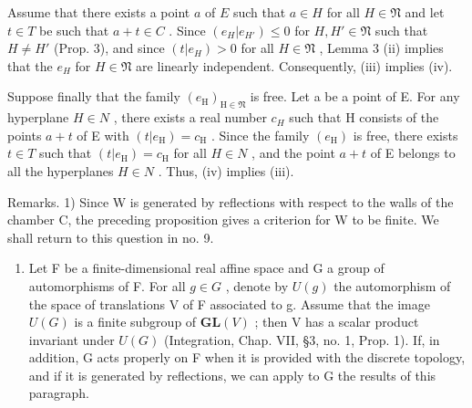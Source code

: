 Assume that there exists a point \(a\) of \(E\) such that \(a \in H\) for all \(H \in \mathfrak{N}\) and let \(t \in T\) be such that \(a + t \in C\) . Since \((e_H | e_{H'}) \leqslant 0\) for \(H, H' \in \mathfrak{N}\) such that \(H \neq H'\) (Prop. 3), and since \((t | e_H) > 0\) for all \(H \in \mathfrak{N}\) , Lemma 3 (ii) implies that the \(e_H\) for \(H \in \mathfrak{N}\) are linearly independent. Consequently, (iii) implies (iv).

Suppose finally that the family \((e_{\mathrm{H}})_{\mathrm{H}\in\mathfrak{N}}\) is free. Let a be a point of E. For any hyperplane \(H\in N\) , there exists a real number \(c_{H}\) such that H consists of the points \(a+t\) of E with \((t|e_{\mathrm{H}})=c_{\mathrm{H}}\) . Since the family \((e_{\mathrm{H}})\) is free, there exists \(t\in T\) such that \((t|e_{\mathrm{H}})=c_{\mathrm{H}}\) for all \(H\in N\) , and the point \(a+t\) of E belongs to all the hyperplanes \(H\in N\) . Thus, (iv) implies (iii).

Remarks. 1) Since W is generated by reflections with respect to the walls of the chamber C, the preceding proposition gives a criterion for W to be finite. We shall return to this question in no. 9.

\begin{enumerate}
\def\labelenumi{\arabic{enumi})}
\setcounter{enumi}{1}
\tightlist
\item
  Let F be a finite-dimensional real affine space and G a group of automorphisms of F. For all \(g \in G\) , denote by \(U(g)\) the automorphism of the space of translations V of F associated to g. Assume that the image \(U(G)\) is a finite subgroup of \(\mathbf{GL}(V)\) ; then V has a scalar product invariant under \(U(G)\) (Integration, Chap. VII, §3, no. 1, Prop. 1). If, in addition, G acts properly on F when it is provided with the discrete topology, and if it is generated by reflections, we can apply to G the results of this paragraph.
\end{enumerate}

